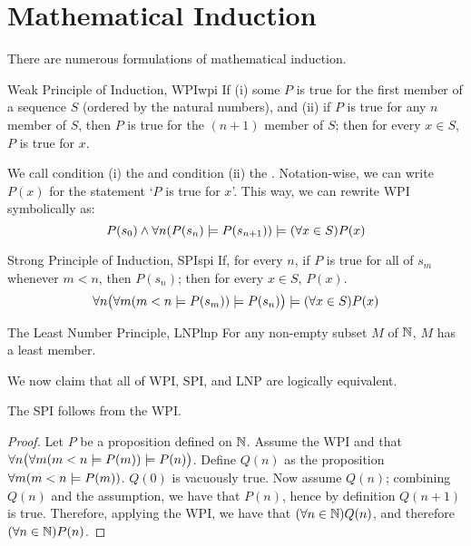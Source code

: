 \documentclass{styles/tufte}
\author{Jiaming (George) Yu}
\date{\today}
\begin{document}
\maketitle
\tableofcontents
\newpage


\section{Mathematical Induction}

There are numerous formulations of mathematical induction.

\begin{axiom}{Weak Principle of Induction, WPI}{wpi}
  If (i) some $P$ is true for the first member of a sequence $S$ (ordered by the natural numbers), and (ii) if $P$ is true for any $n$ member of $S$, then $P$ is true for the $(n + 1)$ member of $S$; then for every $x \in S$, $P$ is true for $x$.
\end{axiom}

We call condition (i) the  and condition (ii) the . Notation-wise, we can write $P(x)$ for the statement `$P$ is true for $x$'. This way, we can rewrite WPI symbolically as:
\[ P(s_0) \wedge \forall n (P(s_n) \entails P(s_{n+1})) \entails (\forall x \in S) P(x) \]

\begin{axiom}{Strong Principle of Induction, SPI}{spi}
  If, for every $n$, if $P$ is true for all of $s_m$ whenever $m < n$, then $P(s_n)$; then for every $x \in S$, $P(x)$.
  \[ \forall n \left(\forall m (m < n \entails P(s_m)) \entails P(s_n)\right) \entails (\forall x \in S) P(x) \]
\end{axiom}

\begin{axiom}{The Least Number Principle, LNP}{lnp}
  For any non-empty subset $M$ of $\mathbb{N}$, $M$ has a least member.
\end{axiom}

We now claim that all of WPI, SPI, and LNP are logically equivalent.

\begin{theorem}{}{}
  The SPI follows from the WPI.
\end{theorem}

\begin{proof}
  Let $P$ be a proposition defined on $\mathbb{N}$. Assume the WPI and that $\forall n \left(\forall m (m < n \entails P(m)) \entails P(n)\right)$. Define $Q(n)$ as the proposition $\forall m (m < n \entails P(m))$. $Q(0)$ is vacuously true. Now assume $Q(n)$; combining $Q(n)$ and the assumption, we have that $P(n)$, hence by definition $Q(n + 1)$ is true. Therefore, applying the WPI, we have that $(\forall n \in \mathbb{N}) Q(n)$, and therefore $(\forall n \in \mathbb{N}) P(n)$.
\end{proof}
\end{document}
